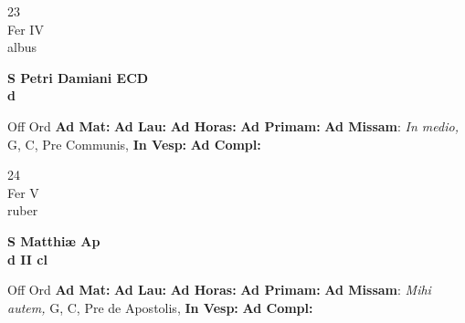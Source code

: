 \documentclass[10pt, openany]{book}
\begin{document}
    \begin{center}
        \begin{minipage}{3.5in}
            \vspace{2em}
            \begin{minipage}{0.5in}
                {\Huge 23} \\
                {\normalsize Fer IV} \\
                {\normalsize albus}
            \end{minipage}
            \begin{minipage}{3.0in}
                \textbf{ \large S Petri Damiani ECD \\
                \textnormal{\normalsize d}} \\ 
            \end{minipage}
            \begin{justify}Off Ord
                \textbf{Ad Mat: }
                \textbf{Ad Lau: }
                \textbf{Ad Horas: }
                \textbf{Ad Primam: }\textbf{Ad Missam}: \textit{In medio,} G, C, Pre Communis,  
                \textbf{In Vesp: }
                \textbf{Ad Compl: }
            \end{justify}
        \end{minipage}
    \end{center}

    \begin{center}
        \begin{minipage}{3.5in}
            \vspace{2em}
            \begin{minipage}{0.5in}
                {\Huge 24} \\
                {\normalsize Fer V} \\
                {\normalsize ruber}
            \end{minipage}
            \begin{minipage}{3.0in}
                \textbf{ \large S Matthiæ Ap \\
                \textnormal{\normalsize d II cl}} \\ 
            \end{minipage}
            \begin{justify}Off Ord
                \textbf{Ad Mat: }
                \textbf{Ad Lau: }
                \textbf{Ad Horas: }
                \textbf{Ad Primam: }\textbf{Ad Missam}: \textit{Mihi autem,} G, C, Pre de Apostolis,  
                \textbf{In Vesp: }
                \textbf{Ad Compl: }
            \end{justify}
        \end{minipage}
    \end{center}
\end{document}
